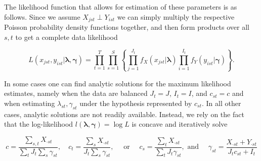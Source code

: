The likelihood function that allows for estimation of these parameters is as follows.  Since we assume $X_{jst} \perp Y_{ist}$ we can simply multiply the respective Poisson probability density functions together, and then form products over all $s,t$ to get a complete data likelihood 

\begin{equation}
  \label{eq:likelihood}
  L(x_{jst}, y_{ist} |\boldsymbol{\lambda}, \boldsymbol{\gamma}) = \prod_{t = 1}^{T} \prod_{s=1}^S \left\{ \prod_{j=1}^{J_t} f_X(x_{jst}|\boldsymbol{\lambda}) \prod_{i=1}^{I_t} f_Y(y_{ist} | \boldsymbol{\gamma}) \right\}.
\end{equation}

\noindent In some cases one can find analytic solutions for the maximum likelihood estimates, namely when the data are balanced $J_t = J$, $I_t = I$, and $c_{st} = c$ and when estimating $\lambda_{st}, \gamma_{st}$ under the hypothesis represented by $c_{st}$.  In all other cases, analytic solutions are not readily available.  Instead, we rely on the fact that the log-likelihood $l(\boldsymbol{\lambda}, \boldsymbol{\gamma}) = \log{L}$ is concave and iteratively solve 

\begin{equation*}
  c = \frac{\sum_{s,t} X_{\cdot st}}{\sum_t J_t \sum_s \gamma_{st}}, \quad c_t =  \frac{\sum_s X_{\cdot st}}{J_t \sum_s \gamma_{st}}, \quad \text{ or } \quad c_s = \frac{\sum_{t}X_{\cdot st}}{\sum_t J_t \gamma_{st}}, \text{ and } \quad \gamma_{st} = \frac{X_{\cdot st} + Y_{\cdot st}}{J_tc_{st} + I_t}
\end{equation*}


